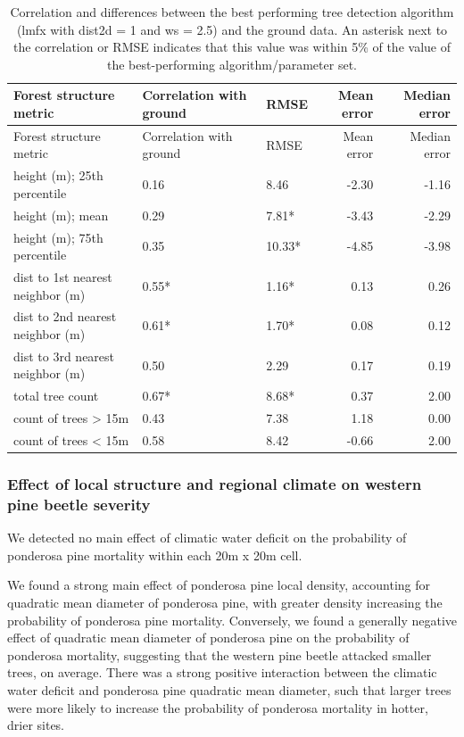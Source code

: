 \documentclass[]{article}
\begin{document}
\begin{longtable}[]{@{}lllrr@{}}
\caption{Correlation and differences between the best performing tree
detection algorithm (lmfx with dist2d = 1 and ws = 2.5) and the ground
data. An asterisk next to the correlation or RMSE indicates that this
value was within 5\% of the value of the best-performing
algorithm/parameter set.}\tabularnewline
\toprule
Forest structure metric & Correlation with ground & RMSE & Mean error &
Median error\tabularnewline
\midrule
\endfirsthead
\toprule
Forest structure metric & Correlation with ground & RMSE & Mean error &
Median error\tabularnewline
\midrule
\endhead
height (m); 25th percentile & 0.16 & 8.46 & -2.30 & -1.16\tabularnewline
height (m); mean & 0.29 & 7.81* & -3.43 & -2.29\tabularnewline
height (m); 75th percentile & 0.35 & 10.33* & -4.85 &
-3.98\tabularnewline
dist to 1st nearest neighbor (m) & 0.55* & 1.16* & 0.13 &
0.26\tabularnewline
dist to 2nd nearest neighbor (m) & 0.61* & 1.70* & 0.08 &
0.12\tabularnewline
dist to 3rd nearest neighbor (m) & 0.50 & 2.29 & 0.17 &
0.19\tabularnewline
total tree count & 0.67* & 8.68* & 0.37 & 2.00\tabularnewline
count of trees \textgreater{} 15m & 0.43 & 7.38 & 1.18 &
0.00\tabularnewline
count of trees \textless{} 15m & 0.58 & 8.42 & -0.66 &
2.00\tabularnewline
\bottomrule
\end{longtable}

\subsubsection{Effect of local structure and regional climate on western
pine beetle
severity}\label{effect-of-local-structure-and-regional-climate-on-western-pine-beetle-severity}

We detected no main effect of climatic water deficit on the probability
of ponderosa pine mortality within each 20m x 20m cell.

We found a strong main effect of ponderosa pine local density,
accounting for quadratic mean diameter of ponderosa pine, with greater
density increasing the probability of ponderosa pine mortality.
Conversely, we found a generally negative effect of quadratic mean
diameter of ponderosa pine on the probability of ponderosa mortality,
suggesting that the western pine beetle attacked smaller trees, on
average. There was a strong positive interaction between the climatic
water deficit and ponderosa pine quadratic mean diameter, such that
larger trees were more likely to increase the probability of ponderosa
mortality in hotter, drier sites.
\end{document}
